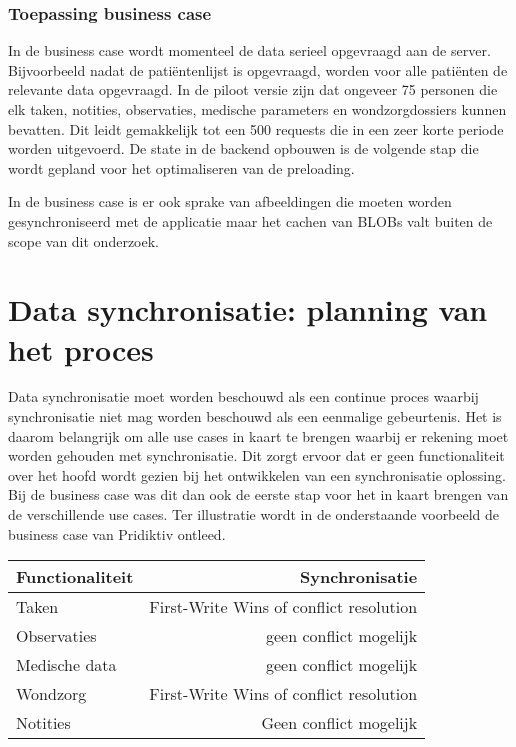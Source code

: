 \subsubsection{Toepassing business case}
In de business case wordt momenteel de data serieel opgevraagd aan de server. Bijvoorbeeld nadat de pati\"entenlijst is opgevraagd, worden voor alle pati\"enten de relevante data opgevraagd. In de piloot versie zijn dat ongeveer 75 personen die elk taken, notities, observaties, medische parameters en wondzorgdossiers kunnen bevatten. Dit leidt gemakkelijk tot een 500 requests die in een zeer korte periode worden uitgevoerd. De state in de backend opbouwen is de volgende stap die wordt gepland voor het optimaliseren van de preloading. 

In de business case is er ook sprake van afbeeldingen die moeten worden gesynchroniseerd met de applicatie maar het cachen van BLOBs valt buiten de scope van dit onderzoek.

\section{Data synchronisatie: planning van het proces}
Data synchronisatie moet worden beschouwd als een continue proces\autocite{data-integration-steps} waarbij synchronisatie niet mag worden beschouwd als een eenmalige gebeurtenis. Het is daarom belangrijk om alle use cases in kaart te brengen waarbij er rekening moet worden gehouden met synchronisatie. Dit zorgt ervoor dat er geen functionaliteit over het hoofd wordt gezien bij het ontwikkelen van een synchronisatie oplossing. Bij de business case was dit dan ook de eerste stap voor het in kaart brengen van de verschillende use cases. Ter illustratie wordt in de onderstaande voorbeeld de business case van Pridiktiv ontleed.

\begin{center}
    \begin{tabular}{ l | r }
    \hline
    Functionaliteit & Synchronisatie \\ \hline
    Taken & First-Write Wins of conflict resolution \\
    Observaties & geen conflict mogelijk \\
    Medische data & geen conflict mogelijk \\
    Wondzorg & First-Write Wins of conflict resolution \\
    Notities & Geen conflict mogelijk \\
    \hline
    \end{tabular}
\end{center}

